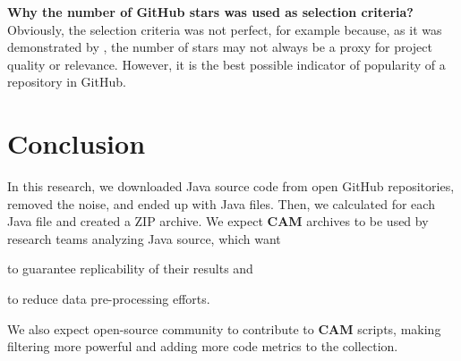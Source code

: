 \documentclass[sigplan,nonacm,review,anonymous]{acmart}
\newcommand\cam{{\sffamily\bfseries CAM}}
\begin{document}
\textbf{Why the number of GitHub stars was used as selection criteria?}
Obviously, the selection criteria was not perfect, for example because,
as it was demonstrated by \citet{munaiah2017curating}, the number of stars
may not always be a proxy for project quality or relevance. However,
it is the best possible indicator of popularity of a repository in GitHub.

\section{Conclusion}\label{sec:conclusion}

In this research, we downloaded Java source code from
\unskip{}
open GitHub repositories, removed the noise, and ended up with
\unskip{} Java files.
Then, we calculated
\unskip{}
for each Java file and created a ZIP archive.
We expect \cam{} archives to be used by research teams analyzing Java source, which want
\begin{inparaenum}[(a)]
\item to guarantee replicability of their results
and
\item to reduce data pre-processing efforts.
\end{inparaenum}
We also expect open-source community to contribute to \cam{} scripts,
making filtering more powerful and adding more code metrics to the collection.



\end{document}
